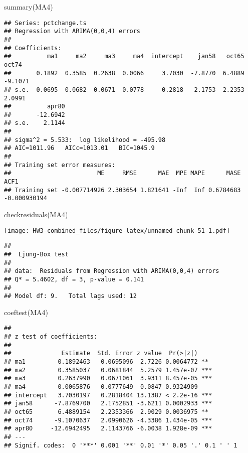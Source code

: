 \documentclass[
]{article}
\newenvironment{Shaded}{\begin{snugshade}}{\end{snugshade}}
\newcommand{\FunctionTok}[1]{\textcolor[rgb]{0.00,0.00,0.00}{#1}}
\newcommand{\NormalTok}[1]{#1}
\begin{document}
\begin{Shaded}
\begin{Highlighting}[]
\FunctionTok{summary}\NormalTok{(MA4)}
\end{Highlighting}
\end{Shaded}

\begin{verbatim}
## Series: pctchange.ts 
## Regression with ARIMA(0,0,4) errors 
## 
## Coefficients:
##          ma1     ma2     ma3     ma4  intercept    jan58   oct65    oct74
##       0.1892  0.3585  0.2638  0.0066     3.7030  -7.8770  6.4889  -9.1071
## s.e.  0.0695  0.0682  0.0671  0.0778     0.2818   2.1753  2.2353   2.0991
##          apr80
##       -12.6942
## s.e.    2.1144
## 
## sigma^2 = 5.533:  log likelihood = -495.98
## AIC=1011.96   AICc=1013.01   BIC=1045.9
## 
## Training set error measures:
##                        ME     RMSE      MAE  MPE MAPE      MASE         ACF1
## Training set -0.007714926 2.303654 1.821641 -Inf  Inf 0.6784683 -0.000930194
\end{verbatim}

\begin{Shaded}
\begin{Highlighting}[]
\FunctionTok{checkresiduals}\NormalTok{(MA4)}
\end{Highlighting}
\end{Shaded}

\texttt{[image: HW3-combined\_files/figure-latex/unnamed-chunk-51-1.pdf]}

\begin{verbatim}
## 
##  Ljung-Box test
## 
## data:  Residuals from Regression with ARIMA(0,0,4) errors
## Q* = 5.4602, df = 3, p-value = 0.141
## 
## Model df: 9.   Total lags used: 12
\end{verbatim}

\begin{Shaded}
\begin{Highlighting}[]
\FunctionTok{coeftest}\NormalTok{(MA4)}
\end{Highlighting}
\end{Shaded}

\begin{verbatim}
## 
## z test of coefficients:
## 
##              Estimate  Std. Error z value  Pr(>|z|)    
## ma1         0.1892463   0.0695096  2.7226 0.0064772 ** 
## ma2         0.3585037   0.0681844  5.2579 1.457e-07 ***
## ma3         0.2637990   0.0671061  3.9311 8.457e-05 ***
## ma4         0.0065876   0.0777649  0.0847 0.9324909    
## intercept   3.7030197   0.2818404 13.1387 < 2.2e-16 ***
## jan58      -7.8769700   2.1752851 -3.6211 0.0002933 ***
## oct65       6.4889154   2.2353366  2.9029 0.0036975 ** 
## oct74      -9.1070637   2.0990626 -4.3386 1.434e-05 ***
## apr80     -12.6942495   2.1143766 -6.0038 1.928e-09 ***
## ---
## Signif. codes:  0 '***' 0.001 '**' 0.01 '*' 0.05 '.' 0.1 ' ' 1
\end{verbatim}
\end{document}
